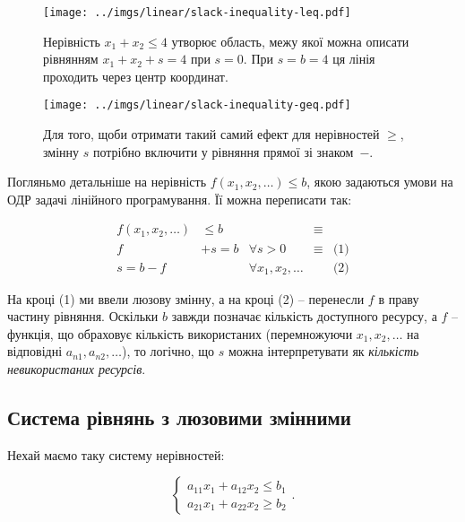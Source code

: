 \documentclass[\main/book.tex]{subfiles}
\begin{document}
\begin{figure*}
 \centering
 \begin{minipage}[t]{.47\textwidth}
  \texttt{[image: ../imgs/linear/slack-inequality-leq.pdf]}
  \caption{Нерівність $x_1 + x_2 \leq 4$ утворює область, межу якої можна описати рівнянням $x_1 + x_2 + s = 4$ при $s=0$. При $s=b=4$ ця лі\-нія проходить через центр координат.}
  \label{pic:linear:slack_inequality_leq}
 \end{minipage}\qquad
 \begin{minipage}[t]{.47\textwidth}
  \texttt{[image: ../imgs/linear/slack-inequality-geq.pdf]}
  \caption{Для того, щоби отримати такий самий ефект для нерівностей \flqq{}$\geq$\frqq{}, змінну $s$ потрібно включити у рівняння прямої зі знаком~\flqq{}$-$\frqq{}.}
  \label{pic:linear:slack_inequality_geq}
 \end{minipage}
\end{figure*}

Погляньмо детальніше на нерівність $f(x_1, x_2, \ldots) \leq b$, якою задаються умови на ОДР задачі лінійного програмування. Її можна переписати так:
 
\[
 \begin{array}{lrlll}
  f(x_1, x_2, \ldots) &  \leq b &                         & \equiv &            \\
  f                   & + s = b & \forall s > 0           & \equiv & \text{(1)} \\
  s = b - f           &         & \forall x_1, x_2, \ldots &        & \text{(2)}
 \end{array}
\]

На кроці (1) ми ввели люзову змінну, а на кроці (2) -- перенесли $f$ в праву частину рівняння. Оскільки $b$ завжди позначає кількість доступного ресурсу, а $f$ -- функція, що обраховує кількість використаних (перемножуючи $x_1, x_2, \ldots$ на відповідні $a_{n1}, a_{n2}, \ldots$), то логічно, що $s$ можна інтерпретувати як \textit{кількість невикористаних ресурсів}.

\subsection{Система рівнянь з люзовими змінними}

Нехай маємо таку систему нерівностей:

\[
 \left\{
  \begin{array}{l}
   a_{11} x_1 + a_{12} x_2 \leq b_1 \\
   a_{21} x_1 + a_{22} x_2 \geq b_2
  \end{array}
 \right. .
\]
\end{document}
